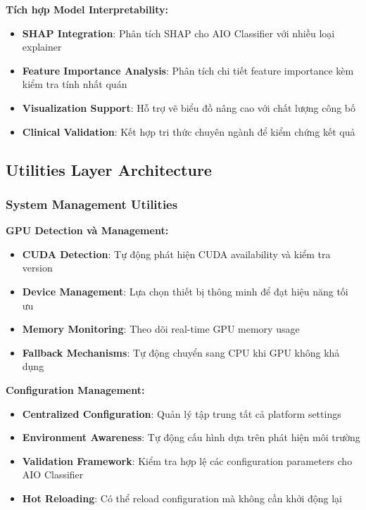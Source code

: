 \textbf{Tích hợp Model Interpretability:}
\begin{itemize}
    \item \textbf{SHAP Integration}: Phân tích SHAP cho AIO Classifier với nhiều loại explainer
    \item \textbf{Feature Importance Analysis}: Phân tích chi tiết feature importance kèm kiểm tra tính nhất quán
    \item \textbf{Visualization Support}: Hỗ trợ vẽ biểu đồ nâng cao với chất lượng công bố
    \item \textbf{Clinical Validation}: Kết hợp tri thức chuyên ngành để kiểm chứng kết quả
\end{itemize}

\subsection{Utilities Layer Architecture}

\subsubsection{System Management Utilities}

\textbf{GPU Detection và Management:}
\begin{itemize}
    \item \textbf{CUDA Detection}: Tự động phát hiện CUDA availability và kiểm tra version
    \item \textbf{Device Management}: Lựa chọn thiết bị thông minh để đạt hiệu năng tối ưu
    \item \textbf{Memory Monitoring}: Theo dõi real-time GPU memory usage
    \item \textbf{Fallback Mechanisms}: Tự động chuyển sang CPU khi GPU không khả dụng
\end{itemize}

\textbf{Configuration Management:}
\begin{itemize}
    \item \textbf{Centralized Configuration}: Quản lý tập trung tất cả platform settings
    \item \textbf{Environment Awareness}: Tự động cấu hình dựa trên phát hiện môi trường
    \item \textbf{Validation Framework}: Kiểm tra hợp lệ các configuration parameters cho AIO Classifier
    \item \textbf{Hot Reloading}: Có thể reload configuration mà không cần khởi động lại
\end{itemize}

